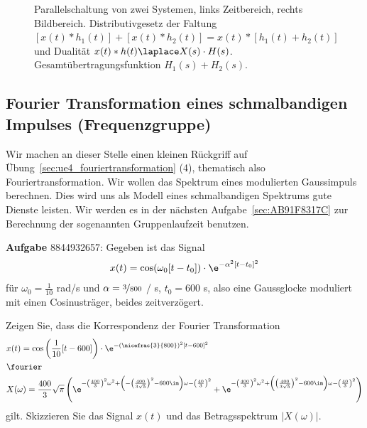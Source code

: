 \begin{figure}
\caption{Parallelschaltung von zwei Systemen, links Zeitbereich, rechts Bildbereich.
Distributivgesetz der Faltung
$[x(t)\ast h_1(t)]+[x(t) \ast h_2(t)] = x(t) \ast [h_1(t)+h_2(t)]$
und Dualität $x(t)\ast h(t) \laplace X(s) \cdot H(s)$.
Gesamtübertragungsfunktion $H_1(s) + H_2(s)$.}
\label{fig:tikz_parallel_081294E23C}
\end{figure}

















\clearpage
\subsection{Fourier Transformation eines schmalbandigen Impulses (Frequenzgruppe)}
\label{sec:8844932657}
\begin{Ziel}
Wir machen an dieser Stelle einen kleinen Rückgriff auf Übung~\ref{sec:ue4_fouriertransformation} (4), thematisch
also Fouriertransformation.
Wir wollen das Spektrum eines modulierten Gaussimpuls berechnen.
Dies wird uns als Modell eines schmalbandigen Spektrums gute
Dienste leisten.
Wir werden es in der nächsten Aufgabe~\ref{sec:AB91F8317C}
zur Berechnung der sogenannten
Gruppenlaufzeit benutzen.
\end{Ziel}
\textbf{Aufgabe} {\tiny 8844932657}: Gegeben ist das Signal
\begin{align}
  x(t) = \cos(\omega_0 [t-t_0]) \cdot \e^{-\alpha^2 [t-t_0]^2}
\end{align}
für $\omega_0 = \frac{1}{10}$ rad/s und $\alpha=\nicefrac{3}{800}$ / s, $t_0 = 600$ s,
also eine Gaussglocke moduliert mit einen Cosinusträger, beides zeitverzögert.

Zeigen Sie, dass die Korrespondenz der Fourier Transformation
\begin{align}
  &x(t) = \cos\left(\frac{1}{10} [t-600]\right) \cdot \e^{-\left(\nicefrac{3}{800}\right)^2 [t-600]^2}\\
  &\fourier\nonumber\\
  &X(\omega) = \frac{400}{3}\sqrt{\pi}\left(
  \e^{-\left(\frac{400}{3}\right)^2 \omega^2 + \left(-\left(\frac{400}{3\sqrt{5}}\right)^2-600\im\right)\omega - \left(\frac{40}{3}\right)^2}+
  \e^{-\left(\frac{400}{3}\right)^2 \omega^2 + \left(\left(\frac{400}{3\sqrt{5}}\right)^2-600\im\right)\omega - \left(\frac{40}{3}\right)^2}\right)
\end{align}
gilt.
Skizzieren Sie das Signal $x(t)$ und das Betragsspektrum $|X(\omega)|$.

